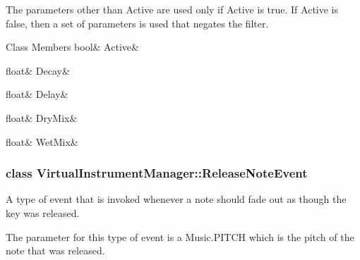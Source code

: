 The parameters other than Active are used only if Active is true. If Active is false, then a set of parameters is used that negates the filter. \begin{DoxyFields}{Class Members}
\mbox{\label{group___virtual_instrument_manager_adbed98a4cc0e2688edabbadfba58a18b}} 
bool&
Active&
\\
\hline

\mbox{\label{group___virtual_instrument_manager_a7e529eb3e4de120daabef80608dcde27}} 
float&
Decay&
\\
\hline

\mbox{\label{group___virtual_instrument_manager_a2594ca005d747a272e4aa411bef21f6e}} 
float&
Delay&
\\
\hline

\mbox{\label{group___virtual_instrument_manager_ab192892df9a03c86b8ce93be434f75be}} 
float&
DryMix&
\\
\hline

\mbox{\label{group___virtual_instrument_manager_a654d4a14431e8c8758f3f58a97d1e61f}} 
float&
WetMix&
\\
\hline

\end{DoxyFields}
\label{class_virtual_instrument_manager_1_1_release_note_event}
\subsubsection{class Virtual\+Instrument\+Manager\+:\+:Release\+Note\+Event}
A type of event that is invoked whenever a note should fade out as though the key was released. 

The parameter for this type of event is a Music.\+P\+I\+T\+CH which is the pitch of the note that was released.

